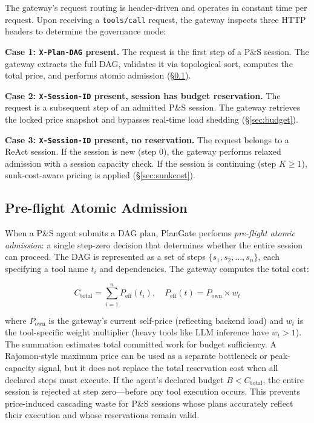 \documentclass[sigconf,review,anonymous]{acmart}
\begin{document}
The gateway's request routing is header-driven and operates in constant time per request. Upon receiving a \texttt{tools/call} request, the gateway inspects three HTTP headers to determine the governance mode:


\noindent\textbf{Case 1: \texttt{X-Plan-DAG} present.} The request is the first step of a P\&S session. The gateway extracts the full DAG, validates it via topological sort, computes the total price, and performs atomic admission (\S\ref{sec:preflight}).

\noindent\textbf{Case 2: \texttt{X-Session-ID} present, session has budget reservation.} The request is a subsequent step of an admitted P\&S session. The gateway retrieves the locked price snapshot and bypasses real-time load shedding (\S\ref{sec:budget}).

\noindent\textbf{Case 3: \texttt{X-Session-ID} present, no reservation.} The request belongs to a ReAct session. If the session is new (step 0), the gateway performs relaxed admission with a session capacity check. If the session is continuing (step $K \geq 1$), sunk-cost-aware pricing is applied (\S\ref{sec:sunkcost}).


\subsection{Pre-flight Atomic Admission}
\label{sec:preflight}

When a P\&S agent submits a DAG plan, PlanGate performs \emph{pre-flight atomic admission}: a single step-zero decision that determines whether the entire session can proceed. The DAG is represented as a set of steps $\{s_1, s_2, \ldots, s_n\}$, each specifying a tool name $t_i$ and dependencies. The gateway computes the total cost:

\begin{equation}
C_{\text{total}} = \sum_{i=1}^{n} P_{\text{eff}}(t_i), \quad P_{\text{eff}}(t) = P_{\text{own}} \times w_t
\end{equation}

\noindent where $P_{\text{own}}$ is the gateway's current self-price (reflecting backend load) and $w_t$ is the tool-specific weight multiplier (heavy tools like LLM inference have $w_t > 1$). The summation estimates total committed work for budget sufficiency. A Rajomon-style maximum price can be used as a separate bottleneck or peak-capacity signal, but it does not replace the total reservation cost when all declared steps must execute. If the agent's declared budget $B < C_{\text{total}}$, the entire session is rejected at step zero---before any tool execution occurs. This prevents price-induced cascading waste for P\&S sessions whose plans accurately reflect their execution and whose reservations remain valid.
\end{document}
